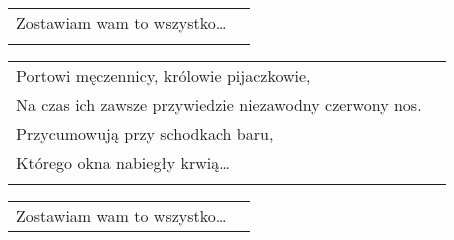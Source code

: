 \documentclass[a5paper]{article}
\begin{document}
\noindent
\begin{tabular}{@{}p{8.50cm}p{3cm}@{}}
Zostawiam wam to wszystko… \\ \\
\end{tabular}

\noindent
\begin{tabular}{@{}p{9.50cm}p{3cm}@{}}
Portowi męczennicy, królowie pijaczkowie,\\
Na czas ich zawsze przywiedzie niezawodny czerwony nos.\\
Przycumowują przy schodkach baru, \\
Którego okna nabiegły krwią… \\ \\
\end{tabular}

\noindent
\begin{tabular}{@{}p{8.50cm}p{3cm}@{}}
Zostawiam wam to wszystko…
\end{tabular}
\end{document}
